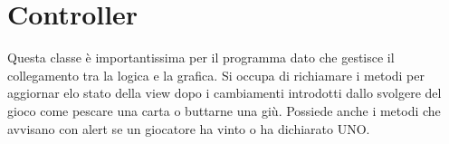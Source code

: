 \section{Controller}
	Questa classe è importantissima per il programma dato che gestisce il collegamento tra la logica e la grafica. Si occupa di richiamare i metodi per aggiornar elo stato della view dopo i cambiamenti introdotti dallo svolgere del gioco come pescare una carta o buttarne una giù. Possiede anche i metodi che avvisano con alert se un giocatore ha vinto o ha dichiarato UNO.

